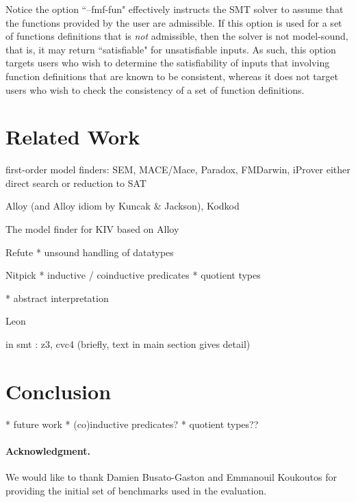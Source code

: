 \documentclass[runningheads,a4paper]{llncs}
\begin{document}
Notice the option ``--fmf-fun" effectively instructs the SMT solver to assume that the functions provided by the user are admissible.
If this option is used for a set of functions definitions that is \emph{not} admissible, then the solver is not model-sound, that is,
it may return ``satisfiable" for unsatisfiable inputs.
As such,
this option targets users who wish to determine the satisfiability of inputs that involving function definitions that are known to be consistent,
whereas it does not target users who wish to check the consistency of a set of function definitions.


\section{Related Work}

first-order model finders: SEM, MACE/Mace, Paradox, FMDarwin, iProver
  either direct search or reduction to SAT

Alloy (and Alloy idiom by Kuncak \& Jackson), Kodkod

The model finder for KIV based on Alloy

Refute
  * unsound handling of datatypes

Nitpick
  * inductive / coinductive predicates
  * quotient types

  * abstract interpretation

Leon

in smt : z3, cvc4 (briefly, text in main section gives detail)


\section{Conclusion}
\label{sec:conclusion}

  * future work
    * (co)inductive predicates?
    * quotient types??

{%
\def\ackname{Acknowledgment}
\paragraph{%
\ackname.}
We would like to thank Damien Busato-Gaston and Emmanouil Koukoutos for
providing the initial set of benchmarks used in the evaluation.
}



{


}
\end{document}
